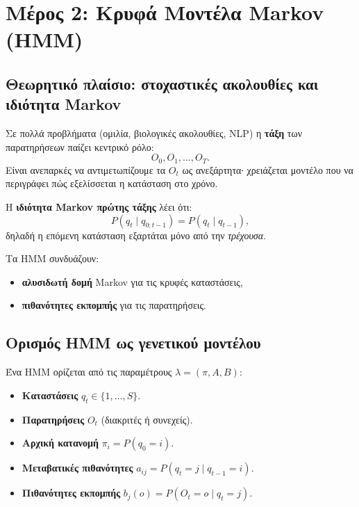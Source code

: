 \documentclass[a4paper,11pt]{article}
\begin{document}
\clearpage

\section{Μέρος 2: Κρυφά Μοντέλα Markov (HMM)}

\subsection{Θεωρητικό πλαίσιο: στοχαστικές ακολουθίες και ιδιότητα Markov}

Σε πολλά προβλήματα (ομιλία, βιολογικές ακολουθίες, NLP) η \textbf{τάξη}
των παρατηρήσεων παίζει κεντρικό ρόλο:
\[
O_0,O_1,\dots,O_T.
\]
Είναι ανεπαρκές να αντιμετωπίζουμε τα $O_t$ ως ανεξάρτητα∙ χρειάζεται
μοντέλο που να περιγράφει πώς εξελίσσεται η κατάσταση στο χρόνο.

Η \textbf{ιδιότητα Markov πρώτης τάξης} λέει ότι:
\[
P(q_t \mid q_{0:t-1}) = P(q_t \mid q_{t-1}),
\]
δηλαδή η επόμενη κατάσταση εξαρτάται μόνο από την \emph{τρέχουσα}.

Τα HMM συνδυάζουν:
\begin{itemize}
  \item \textbf{αλυσιδωτή δομή} Markov για τις κρυφές καταστάσεις,
  \item \textbf{πιθανότητες εκπομπής} για τις παρατηρήσεις.
\end{itemize}

\subsection{Ορισμός HMM ως γενετικού μοντέλου}

Ένα HMM ορίζεται από τις παραμέτρους $\lambda = (\pi, A, B)$:

\begin{itemize}
  \item \textbf{Καταστάσεις} $q_t \in \{1,\dots,S\}$.
  \item \textbf{Παρατηρήσεις} $O_t$ (διακριτές ή συνεχείς).
  \item \textbf{Αρχική κατανομή} $\pi_i = P(q_0=i)$.
  \item \textbf{Μεταβατικές πιθανότητες} $a_{ij} = P(q_t=j \mid q_{t-1}=i)$.
  \item \textbf{Πιθανότητες εκπομπής} $b_j(o) = P(O_t=o \mid q_t=j)$.
\end{itemize}
\end{document}
